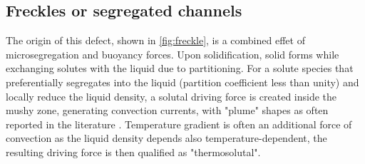 %
%
\subsection*{Freckles or segregated channels} 
%
The origin of this defect, shown in \cref{fig:freckle}, is a combined effet of microsegregation and buoyancy forces. 
Upon solidification, solid forms while exchanging solutes with the liquid due to partitioning.
For a solute species that preferentially segregates into the liquid (partition coefficient less than unity)
and locally reduce the liquid density, a solutal driving force is created inside the mushy zone, generating convection currents, 
with "plume" shapes as often reported in the literature \citep{sarazin_studies_1992, schneider_modeling_1997,
saad_simulation_2015}. Temperature gradient is often an additional force of convection as the liquid density depends also temperature-dependent, 
the resulting driving force is then qualified as "thermosolutal".
%
%
%
